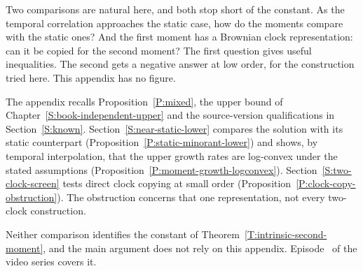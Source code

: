 Two comparisons are natural here, and both stop short of the constant. As the
temporal correlation approaches the static case, how do the moments compare
with the static ones? And the first moment has a Brownian clock
representation: can it be copied for the second moment? The first question
gives useful inequalities. The second gets a negative answer at low order, for
the construction tried here. This appendix has no figure.

The appendix recalls Proposition~\ref{P:mixed}, the upper bound of
Chapter~\ref{S:book-independent-upper} and the source-version qualifications
in Section~\ref{S:known}. Section~\ref{S:near-static-lower} compares the
solution with its static counterpart
(Proposition~\ref{P:static-minorant-lower}) and shows, by temporal
interpolation, that the upper growth rates are log-convex under the stated
assumptions (Proposition~\ref{P:moment-growth-logconvex}).
Section~\ref{S:two-clock-screen} tests direct clock copying at small order
(Proposition~\ref{P:clock-copy-obstruction}). The obstruction concerns that
one representation, not every two-clock construction.

Neither comparison identifies the constant of
Theorem~\ref{T:intrinsic-second-moment}, and the main argument does not rely
on this appendix. Episode~ of the video series
covers it.
